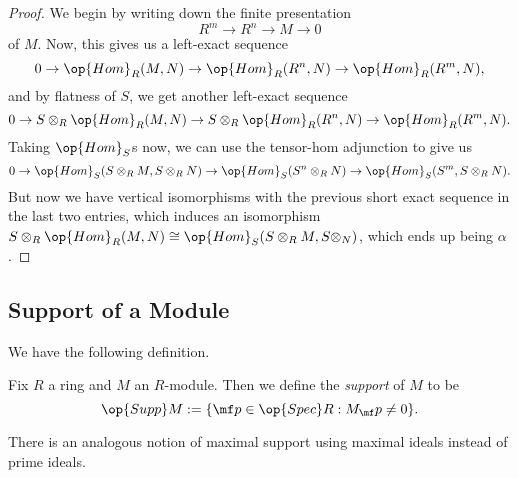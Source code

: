 \begin{proof}
	We begin by writing down the finite presentation
	\[R^m\to R^n\to M\to 0\]
	of $M$. Now, this gives us a left-exact sequence\todo{}
	\[0\to\op{Hom}_R(M,N)\to\op{Hom}_R(R^n,N)\to\op{Hom}_R(R^m,N),\]
	and by flatness of $S$, we get another left-exact sequence
	\[0\to S\otimes_R\op{Hom}_R(M,N)\to S\otimes_R\op{Hom}_R(R^n,N)\to\op{Hom}_R(R^m,N).\]
	Taking $\op{Hom}_S$s now, we can use the tensor-hom adjunction to give us
	\[0\to\op{Hom}_S(S\otimes_RM,S\otimes_RN)\to\op{Hom}_S(S^n\otimes_RN)\to\op{Hom}_S(S^m,S\otimes_RN).\]
	But now we have vertical isomorphisms with the previous short exact sequence in the last two entries, which induces an isomorphism $S\otimes_R\op{Hom}_R(M,N)\cong\op{Hom}_S(S\otimes_RM,S\otimes_N)$, which ends up being $\alpha$.
\end{proof}

\subsection{Support of a Module}
We have the following definition.
\begin{definition}[Support]
	Fix $R$ a ring and $M$ an $R$-module. Then we define the \textit{support} of $M$ to be
	\[\op{Supp}M:=\{\mf p\in\op{Spec}R:M_\mf p\ne0\}.\]
\end{definition}
There is an analogous notion of maximal support using maximal ideals instead of prime ideals.

